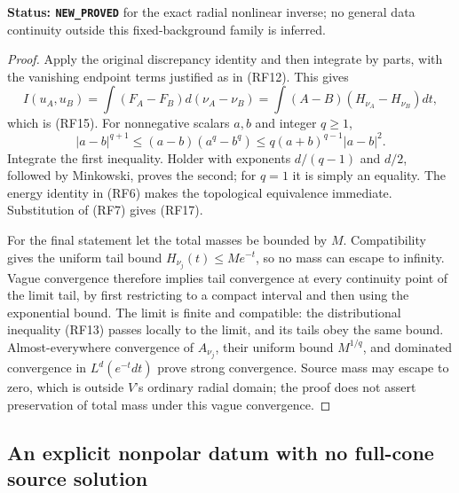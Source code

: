 \noindent\textbf{Status: \texttt{NEW\_PROVED}} for
the exact radial nonlinear inverse; no general data
continuity outside this fixed-background family is inferred.

\begin{proof}
Apply the original discrepancy identity and then
integrate by parts, with the vanishing endpoint
terms justified as in \textup{(RF12)}.  This gives
\[
 I(u_A,u_B)
  =\int(F_A-F_B)d(\nu_A-\nu_B)
  =\int(A-B)(H_{\nu_A}-H_{\nu_B})dt,
\]
which is \textup{(RF15)}.  For nonnegative scalars
$a,b$ and integer $q\ge1$,
\[
 |a-b|^{q+1}\le(a-b)(a^q-b^q)
                      \le q(a+b)^{q-1}|a-b|^2.
\]
Integrate the first inequality.  Holder with exponents
$d/(q-1)$ and $d/2$, followed by Minkowski, proves
the second; for $q=1$ it is simply an equality.
The energy identity in \textup{(RF6)} makes the
topological equivalence immediate.  Substitution
of \textup{(RF7)} gives \textup{(RF17)}.

For the final statement let the total masses be
bounded by $M$.  Compatibility gives the uniform
tail bound $H_{\nu_j}(t)\le Me^{-t}$, so no mass
can escape to infinity.  Vague convergence therefore
implies tail convergence at every continuity point
of the limit tail, by first restricting to a compact
interval and then using the exponential bound.
The limit is finite and compatible: the distributional
inequality \textup{(RF13)} passes locally to the limit,
and its tails obey the same bound.  Almost-everywhere
convergence of $A_{\nu_j}$, their uniform bound
$M^{1/q}$, and dominated convergence in $L^d(e^{-t}dt)$
prove strong convergence.  Source mass may escape to
zero, which is outside $V$'s ordinary radial domain;
the proof does not assert preservation of total mass
under this vague convergence.
\end{proof}

\subsection{An explicit nonpolar datum with no full-cone source solution}

